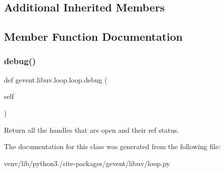 \subsection*{Additional Inherited Members}


\subsection{Member Function Documentation}
\mbox{\label{classgevent_1_1libuv_1_1loop_1_1loop_a5c0c36a1ee75a6b1dca7006963696a83}} 
\subsubsection{\texorpdfstring{debug()}{debug()}}
{\footnotesize\ttfamily def gevent.\+libuv.\+loop.\+loop.\+debug (\begin{DoxyParamCaption}\item[{}]{self }\end{DoxyParamCaption})}

\begin{DoxyVerb}Return all the handles that are open and their ref status.
\end{DoxyVerb}
 

The documentation for this class was generated from the following file\+:\begin{DoxyCompactItemize}
\item 
venv/lib/python3./site-\/packages/gevent/libuv/loop.\+py\end{DoxyCompactItemize}

